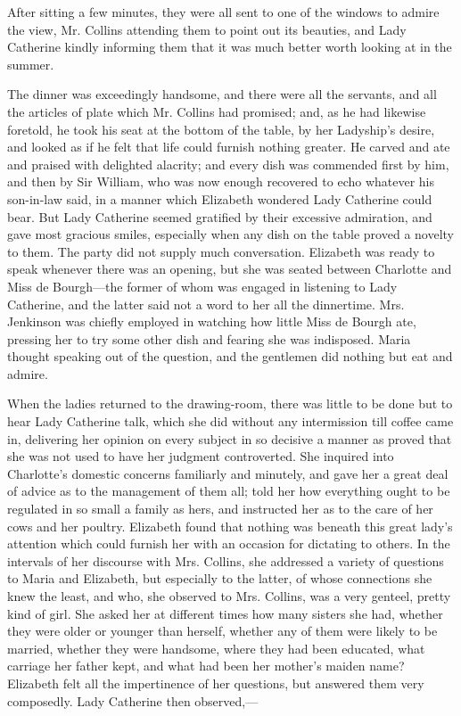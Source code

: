 \documentclass[12pt,openright]{book}
\begin{document}
After sitting a few minutes, they were all sent to one of the windows to admire the view, Mr. Collins attending them to point out its beauties, and Lady Catherine kindly informing them that it was much better worth looking at in the summer.

The dinner was exceedingly handsome, and there were all the servants, and all the articles of plate which Mr. Collins had promised; and, as he had likewise foretold, he took his seat at the bottom of the table, by her Ladyship’s desire, and looked as if he felt that life could furnish nothing greater. He carved and ate and praised with delighted alacrity; and every dish was commended first by him, and then by Sir William, who was now enough recovered to echo whatever his son-in-law said, in a manner which Elizabeth wondered Lady Catherine could bear. But Lady Catherine seemed gratified by their excessive admiration, and gave most gracious smiles, especially when any dish on the table proved a novelty to them. The party did not supply much conversation. Elizabeth was ready to speak whenever there was an opening, but she was seated between Charlotte and Miss de Bourgh—the former of whom was engaged in listening to Lady Catherine, and the latter said not a word to her all the dinnertime. Mrs. Jenkinson was chiefly employed in watching how little Miss de Bourgh ate, pressing her to try some other dish and fearing she was indisposed. Maria thought speaking out of the question, and the gentlemen did nothing but eat and admire.

When the ladies returned to the drawing-room, there was little to be done but to hear Lady Catherine talk, which she did without any intermission till coffee came in, delivering her opinion on every subject in so decisive a manner as proved that she was not used to have her judgment controverted. She inquired into Charlotte’s domestic concerns familiarly and minutely, and gave her a great deal of advice as to the management of them all; told her how everything ought to be regulated in so small a family as hers, and instructed her as to the care of her cows and her poultry. Elizabeth found that nothing was beneath this great lady’s attention which could furnish her with an occasion for dictating to others. In the intervals of her discourse with Mrs. Collins, she addressed a variety of questions to Maria and Elizabeth, but especially to the latter, of whose connections she knew the least, and who, she observed to Mrs. Collins, was a very genteel, pretty kind of girl. She asked her at different times how many sisters she had, whether they were older or younger than herself, whether any of them were likely to be married, whether they were handsome, where they had been educated, what carriage her father kept, and what had been her mother’s maiden name? Elizabeth felt all the impertinence of her questions, but answered them very composedly. Lady Catherine then observed,—
\end{document}
